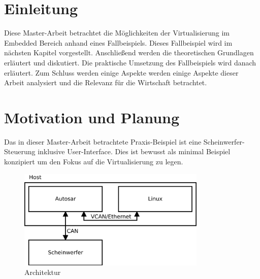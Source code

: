 \documentclass[
  a4paper,					    %
  twoside,
  DIV=calc,     				%
  bibliography=totoc,
  cleardoublepage=empty,
  ngerman,     					%
  final       					%
]{scrbook}
\begin{document}









\mainmatter
\chapter{Einleitung}
\label{sec:Einleitung}

Diese Master-Arbeit betrachtet die Möglichkeiten der Virtualisierung im Embedded Bereich anhand eines Fallbeispiels. Dieses Fallbeispiel wird im nächsten Kapitel vorgestellt. Anschließend werden die theoretischen Grundlagen erläutert und diskutiert. Die praktische Umsetzung des Fallbeispiels wird danach erläutert. Zum Schluss werden einige Aspekte werden einige Aspekte dieser Arbeit analysiert und die Relevanz für die Wirtschaft betrachtet.





\chapter{Motivation und Planung}
\label{sec:MotivationPlanung}

Das in dieser Master-Arbeit betrachtete Praxis-Beispiel ist eine Scheinwerfer-Steuerung inklusive User-Interface. Dies ist bewusst als minimal Beispiel konzipiert um den Fokus auf die Virtualisierung zu legen.

\begin{figure}[ht]
\centering
\includegraphics[width=0.8\textwidth]{overview.png}
\caption{Architektur}
\label{fig:arch}
\end{figure}
\end{document}
